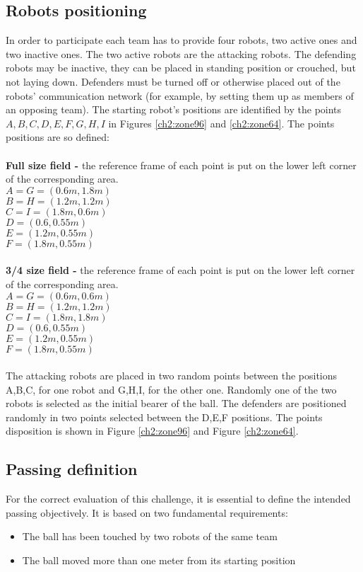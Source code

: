 \subsection{Robots positioning}
In order to participate each team has to provide four robots, two active ones and two inactive ones. The two active robots are the attacking robots. The defending robots may be inactive, they can be placed in standing position or crouched, but not laying down.
Defenders must be turned off or otherwise placed out of the robots' communication network (for example, by setting them up as members of an opposing team).
The starting robot's positions are identified by the points ${A,B,C,D,E,F,G,H,I}$ in Figures \ref{ch2:zone96} and \ref{ch2:zone64}.
The points positions are so defined:
\\
\\
\textbf{Full size field -} the reference frame of each point is put on the lower left corner of the corresponding area.
\\
$A = G = (0.6m, 1.8m)$
\\
$B = H = (1.2m, 1.2m)$
\\
$C = I = (1.8m, 0.6m)$
\\
$D = (0.6, 0.55m)$
\\
$E = (1.2m, 0.55m)$
\\
$F = (1.8m, 0.55m)$
\\
\\
\textbf{3/4 size field -} the reference frame of each point is put on the lower left corner of the corresponding area.
\\
$A = G = (0.6m, 0.6m)$
\\
$B = H = (1.2m, 1.2m)$
\\
$C = I = (1.8m, 1.8m)$
\\
$D = (0.6, 0.55m)$
\\
$E = (1.2m, 0.55m)$
\\
$F = (1.8m, 0.55m)$
\\
\\
The attacking robots are placed in two random points between the positions A,B,C, for one robot and G,H,I, for the other one.  Randomly one of the two robots is selected as the initial bearer of the ball. The defenders are positioned randomly in two points selected between the D,E,F positions.
The points disposition is shown in Figure \ref{ch2:zone96} and Figure \ref{ch2:zone64}.

\subsection{Passing definition}
For the correct evaluation of this challenge, it is essential to define the intended passing objectively. It is based on two fundamental requirements:
\begin{itemize}
    \item The ball has been touched by two robots of the same team
    \item The ball moved more than one meter from its starting position
\end{itemize}


